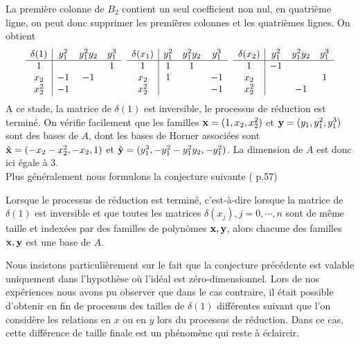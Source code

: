 \documentclass{standalone}
\begin{document}
La première colonne de $B_2$ contient un seul coefficient non nul, en quatrième ligne, on peut donc supprimer les premières colonnes et les quatrièmes lignes. On obtient\\

$$
\begin{array}{c|ccc}
	\delta(1) & y_1^2 & y_1^2y_2 & y_1^3 \\
	\hline
	1  &  &  & 1 \\
	x_2  & -1 & -1 & \\
	x_2^2 & -1 &  &
\end{array}
\hspace{0.2cm}
\begin{array}{c|ccc}
	\delta(x_1) & y_1^2 & y_1^2y_2 & y_1^3 \\
	\hline
	1  & 1 & 1 & \\
	x_2  & 1 &  & -1\\
	x_2^2  &  &  & -1
\end{array}
\hspace{0.2cm}
\begin{array}{c|ccc}
	\delta(x_2) & y_1^2 & y_1^2y_2 & y_1^3 \\
	\hline
	1  & -1 &  & \\
	x_2  &  &  & 1 \\
	x_2^2  &  & -1 &
\end{array}
$$
A ce stade, la matrice de $\delta(1)$ est inversible, le processus de réduction est terminé. On vérifie facilement que les familles $\bold{x} = (1, x_2, x_2^{2})$ et $\bold{y} = (y_1, y_1^{2}, y_1^{3})$ sont des bases de $A$, dont les bases de Horner associées sont $\hat{\bold{x}} = (-x_2-x_2^{2}, -x_{2}, 1)$ et $\hat{\bold{y}} = (y_1^{3}, -y_1^{2}-y_1^{2}y_2, -y_1^{2})$. La dimension de $A$ est donc ici égale à $3$.\\

Plus généralement nous formulons la conjecture suivante (\cite{jpc} p.57)
\begin{conj}
Lorsque le processus de réduction est terminé, c'est-à-dire lorsque la matrice de $\delta(1)$ est inversible et que toutes les matrices $\delta(x_j), j=0, \cdots, n$ sont de même taille et indexées par des familles de polynômes $\bold{x, y}$, alors chacune des familles $\bold{x, y}$ est une base de $A$.
\end{conj}

\begin{rem}
Nous insistons particulièrement sur le fait que la conjecture précédente est valable uniquement dans l'hypothèse où l'idéal est zéro-dimensionnel. Lors de nos expériences nous avons pu observer que dans le cas contraire, il était possible d'obtenir en fin de processus des tailles de $\delta(1)$ différentes suivant que l'on considère les relations en $x$ ou en $y$ lors du processus de réduction. Dans ce cas, cette différence de taille finale est un phénomène qui reste à éclaircir.
\end{rem}
\end{document}
